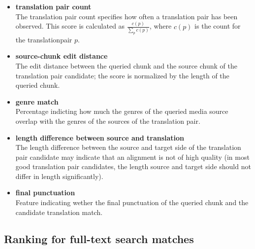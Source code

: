 \begin{itemize}
	\item \textbf{translation pair count}\\%
	The translation pair count specifies how often a translation pair has been observed. This score is calculated as $\frac{c(p)}{ \sum_p{c(p)}  } $, where $c(p)$ is the count for the translationpair $p$.
	
	\item \textbf{source-chunk edit distance}\\
	The edit distance between the queried chunk and the source chunk of the translation pair candidate; the score is normalized by the length of the queried chunk.
	
	\item \textbf{genre match}\\
	Percentage indicting how much the genres of the queried media source overlap with the genres of the sources of the translation pair.

	\item \textbf{length difference between source and translation}\\
	The length difference between the source and target side of the translation pair candidate may indicate that an alignment is not of high quality (in most good translation pair candidates,  the length source and target side should not differ in length significantly).
	
	\item \textbf{final punctuation}\\
	Feature indicating wether the final punctuation of the queried chunk and the candidate translation match.
	
	
	
\end{itemize}



\subsection{Ranking for full-text search matches}


